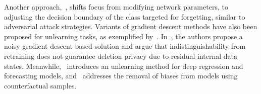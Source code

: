 Another approach,~\cite{chen2023boundaryshifting}, shifts focus from modifying network parameters, to adjusting the decision boundary of the class targeted for forgetting, similar to adversarial attack strategies. Variants of gradient descent methods have also been proposed for unlearning tasks, as exemplified by~\cite{neel2021descent}. In~\cite{chourasia2023forgetunlearning}, the authors propose a noisy gradient descent-based solution and argue that indistinguishability from retraining does not guarantee deletion privacy due to residual internal data states. Meanwhile,~\cite{tarun2023deepunlearning} introduces an unlearning method for deep regression and forecasting models, and~\cite{chen2023fast} addresses the removal of biases from models using counterfactual samples.